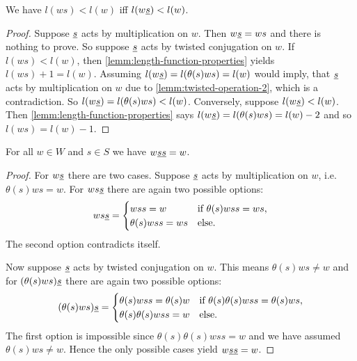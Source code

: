 \begin{lemm}
	We have $l(ws) < l(w)$ iff $l(w \underline{s}) < l(w)$.

	\begin{proof}
		Suppose $\underline{s}$ acts by multiplication on $w$. Then $w \underline{s} = ws$ and there is nothing to prove. So suppose $\underline{s}$ acts by twisted conjugation on $w$. If $l(ws) < l(w)$, then \ref{lemm:length-function-properties} yields $l(ws) + 1 = l(w)$. Assuming $l(w \underline{s}) = l(\theta(s)ws) = l(w)$ would imply, that $\underline{s}$ acts by multiplication on $w$ due to \ref{lemm:twisted-operation-2}, which is a contradiction. So $l(w \underline{s}) = l(\theta(s)ws) < l(w)$. Conversely, suppose $l(w \underline{s}) < l(w)$. Then \ref{lemm:length-function-properties} says $l(w \underline{s}) = l(\theta(s)ws) = l(w) - 2$ and so $l(ws) = l(w) - 1$.
	\end{proof}
\end{lemm}

\begin{lemm}
	For all $w \in W$ and $s \in S$ we have $w \underline{s} \underline{s} = w$.

	\begin{proof}
		For $w \underline{s}$ there are two cases. Suppose $\underline{s}$ acts by multiplication on $w$, i.e. $\theta(s)ws = w$. For $ws \underline{s}$ there are again two possible options:
		$$ ws \underline{s} = \begin{cases}
			wss = w & \textrm{if } \theta(s)wss = ws, \\
			\theta(s)wss = ws & \textrm{else}. \\
		\end{cases} $$
		The second option contradicts itself.

		Now suppose $\underline{s}$ acts by twisted conjugation on $w$. This means $\theta(s)ws \neq w$ and for $(\theta(s)ws) \underline{s}$ there are again two possible options:
		$$ (\theta(s)ws) \underline{s} = \begin{cases}
			\theta(s)wss = \theta(s)w & \textrm{if } \theta(s) \theta(s) w ss = \theta(s) w s, \\
			\theta(s)\theta(s)wss = w & \textrm{else}. \\
		\end{cases} $$
		The first option is impossible since $\theta(s) \theta(s) w ss = w$ and we have assumed $\theta(s)ws \neq w$. Hence the only possible cases yield $w \underline{s} \underline{s} = w$.
	\end{proof}
\end{lemm}

